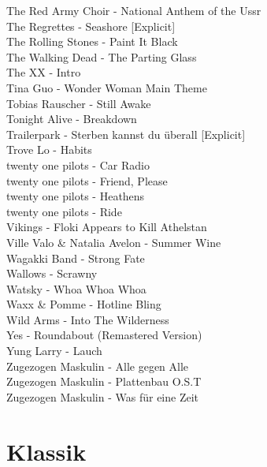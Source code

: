 The Red Army Choir - National Anthem of the Ussr\\
The Regrettes - Seashore [Explicit]\\
The Rolling Stones - Paint It Black\\
The Walking Dead - The Parting Glass\\
The XX - Intro\\
Tina Guo - Wonder Woman Main Theme\\
Tobias Rauscher - Still Awake\\
Tonight Alive - Breakdown\\
Trailerpark - Sterben kannst du überall [Explicit]\\
Trove Lo - Habits\\
twenty one pilots - Car Radio\\
twenty one pilots - Friend, Please\\
twenty one pilots - Heathens\\
twenty one pilots - Ride\\
Vikings - Floki Appears to Kill Athelstan\\
Ville Valo \& Natalia Avelon - Summer Wine\\
Wagakki Band - Strong Fate\\
Wallows - Scrawny\\
Watsky - Whoa Whoa Whoa\\
Waxx \& Pomme - Hotline Bling\\
Wild Arms - Into The Wilderness\\
Yes - Roundabout (Remastered Version)\\
Yung Larry - Lauch\\
Zugezogen Maskulin - Alle gegen Alle\\
Zugezogen Maskulin - Plattenbau O.S.T\\
Zugezogen Maskulin - Was für eine Zeit\\

\section{Klassik}

